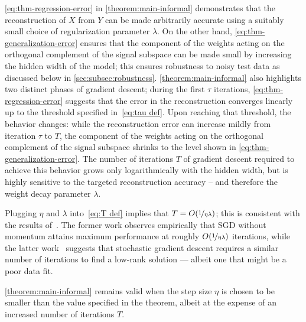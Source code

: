 \cref{eq:thm-regression-error} in \cref{theorem:main-informal} demonstrates that the reconstruction of $X$ from $Y$ can be made arbitrarily accurate using a suitably small choice of regularization parameter $\lambda$.
On the other hand, \cref{eq:thm-generalization-error} ensures that the component of the weights acting on the orthogonal complement of the signal subspace can be made small by increasing the hidden width of the model; this ensures robustness to noisy test data as discussed below in \cref{sec:subsec:robustness}.
\cref{theorem:main-informal} also highlights two distinct phases of gradient descent; during the first $\tau$ iterations, \cref{eq:thm-regression-error} suggests that the error in the reconstruction converges linearly up to the threshold specified in~\eqref{eq:tau def}. Upon reaching that threshold, the behavior changes:
while the reconstruction error can increase mildly from
iteration $\tau$ to $T$, the component of the weights acting on the orthogonal complement of the signal subspace shrinks to the level shown in \cref{eq:thm-generalization-error}.
The number of iterations $T$ of gradient descent required to achieve this behavior grows only logarithmically with the hidden width, but is highly sensitive to the targeted reconstruction accuracy -- and therefore the weight decay parameter $\lambda$.

\begin{remark}
	Plugging $\eta$ and $\lambda$ into~\cref{eq:T def} implies that $T = O(\nicefrac{1}{\eta \lambda})$; this is consistent with the
	results of~\citet{lewkowycz2020training,wang2024implicit}. The
	former work observes empirically that SGD without momentum
	attains maximum performance at roughly $O(\nicefrac{1}{\eta \lambda})$ iterations,
	while the latter work~\citep[Theorem B.2]{wang2024implicit}
	suggests that stochastic gradient descent requires a similar number of iterations to find a low-rank solution --- albeit one that might be a poor data fit.
\end{remark}

\begin{remark}
	\label{remark:small-eta}
	\cref{theorem:main-informal} remains valid when the step size $\eta$ is chosen to be smaller than the value specified in the theorem, albeit at the expense of an increased number of iterations $T$.
\end{remark}
